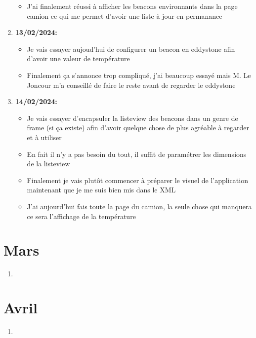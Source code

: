 \documentclass[10pt,a4paper]{book}
\begin{document}
\begin{enumerate}
\begin{itemize}
            \item J'ai finalement réussi à afficher les beacons environnants dans la page camion ce qui me permet d'avoir une liste à jour en permanance
        \end{itemize}
    \item \textbf{13/02/2024:}
        \begin{itemize}
            \item Je vais essayer aujoud'hui de configurer un beacon en eddystone afin d'avoir une valeur de température
            \item Finalement ça s'annonce trop compliqué, j'ai beaucoup essayé mais M. Le Joncour m'a conseillé de faire le reste avant de regarder le eddystone
        \end{itemize}
    \item \textbf{14/02/2024:}
        \begin{itemize}
            \item Je vais essayer d'encapsuler la listeview des beacons dans un genre de frame (si ça existe) afin d'avoir quelque chose de plus agréable à regarder et à utiliser
            \item En fait il n'y a pas besoin du tout, il suffit de paramétrer les dimensions de la listeview
            \item Finalement je vais plutôt commencer à préparer le visuel de l'application maintenant que je me suis bien mis dans le XML
            \item J'ai aujourd'hui fais toute la page du camion, la seule chose qui manquera ce sera l'affichage de la température
        \end{itemize}
    
\end{enumerate}

\chapter{Mars}

\begin{enumerate}
    \item 
\end{enumerate}

\chapter{Avril}

\begin{enumerate}
    \item 
\end{enumerate}
\end{document}
